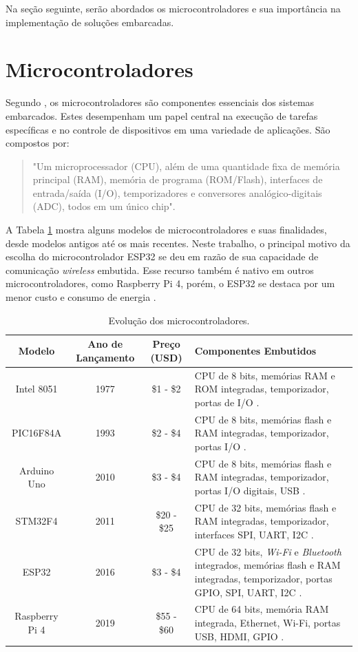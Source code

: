 Na seção seguinte, serão abordados os microcontroladores e sua importância na implementação de soluções embarcadas.

\section{Microcontroladores}

Segundo \textcite{lee2008cyber}, os microcontroladores são componentes essenciais dos sistemas embarcados. Estes desempenham um papel central na execução de tarefas específicas e no controle de dispositivos em uma variedade de aplicações. São compostos por:

\begin{quote}
  "Um microprocessador (CPU), além de uma quantidade fixa de memória principal (RAM), memória de programa (ROM/Flash),  interfaces de entrada/saída (I/O), temporizadores e conversores analógico-digitais (ADC), todos em um único chip". \parencite[{p. 40}]{Mazid_microcontrolador2011}
\end{quote}

A Tabela \ref{tab:evolucao_microcontroladores} mostra alguns modelos de microcontroladores e suas finalidades, desde modelos antigos até os mais recentes. Neste trabalho, o principal motivo da escolha do microcontrolador ESP32 se deu em razão de sua capacidade de comunicação \textit{wireless} embutida. Esse recurso também é nativo em outros microcontroladores, como Raspberry Pi 4, porém, o ESP32 se destaca por um menor custo e consumo de energia \parencite{ESP32_usage}.

\begin{table}[!htb]
\caption{Evolução dos microcontroladores.} \label{tab:evolucao_microcontroladores}
\begin{tabularx}{\textwidth}{|c|c|c|X|} \hline
\textbf{Modelo} & \textbf{Ano de Lançamento} & \textbf{Preço (USD)} & \textbf{Componentes Embutidos} \\ \hline
Intel 8051 & 1977 & \$1 - \$2 & CPU de 8 bits, memórias RAM e ROM integradas, temporizador, portas de I/O \parencite{8051_usage}. \\ \hline
PIC16F84A & 1993 & \$2 - \$4 & CPU de 8 bits, memórias flash e RAM integradas, temporizador, portas I/O \parencite{PIC16F84A_usage}. \\ \hline
Arduino Uno & 2010 & \$3 - \$4 & CPU de 8 bits, memórias flash e RAM integradas, temporizador, portas I/O digitais, USB \parencite{Arduino_usage}. \\ \hline
STM32F4 & 2011 & \$20 - \$25 & CPU de 32 bits, memórias flash e RAM integradas, temporizador, interfaces SPI, UART, I2C \parencite{STM32F4_usage}. \\ \hline
ESP32 & 2016 & \$3 - \$4 & CPU de 32 bits, \textit{Wi-Fi} e \textit{Bluetooth} integrados, memórias flash e RAM integradas, temporizador, portas GPIO, SPI, UART, I2C \parencite{ESP32_usage}. \\ \hline
Raspberry Pi 4 & 2019 & \$55 - \$60 & CPU de 64 bits, memória RAM integrada, Ethernet, Wi-Fi, portas USB, HDMI, GPIO \parencite{RaspberryPi4_usage}. \\ \hline
\end{tabularx}
\end{table}

